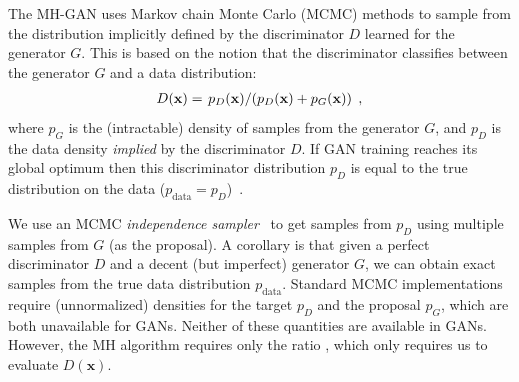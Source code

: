 \documentclass{article}
\renewcommand{\vec}[1]{{\boldsymbol{\mathbf{#1}}}} %
\newcommand{\PG}{{p_G}}
\newcommand{\PD}{{p_D}}
\newcommand{\PR}{{p_{\textrm{data}}}}
\begin{document}
The MH-GAN uses Markov chain Monte Carlo (MCMC) methods to sample from the distribution implicitly defined by the discriminator $D$ learned for the generator $G$.
This is based on the notion that the discriminator classifies between the generator $G$ and a data distribution:
\begin{align}
  D(\vec x) = \left. \PD(\vec x) \middle/ (\PD(\vec x) + \PG(\vec x)) \right. \,, \label{eq:define PD}
\end{align}
where $\PG$ is the (intractable) density of samples from the generator $G$, and $\PD$ is the data density \emph{implied} by the discriminator $D$.
If GAN training reaches its global optimum then this discriminator distribution $\PD$ is equal to the true distribution on the data ($\PR = \PD$)~\citep{Goodfellow2014}.

We use an MCMC \emph{independence sampler}~\citep{Tierney1994} to get samples from $\PD$ using multiple samples from $G$ (as the proposal)\@.
A corollary is that given a perfect discriminator $D$ and a decent (but imperfect) generator $G$, we can obtain exact samples from the true data distribution $\PR$.
Standard MCMC implementations require (unnormalized) densities for the target $\PD$ and the proposal $\PG$, which are both unavailable for GANs.
Neither of these quantities are available in GANs.
However, the MH algorithm requires only the ratio \smash{$\PD / \PG = D(\vec x)/(1 - D(\vec x))$}, which only requires us to evaluate $D(\vec x)$.
\end{document}

